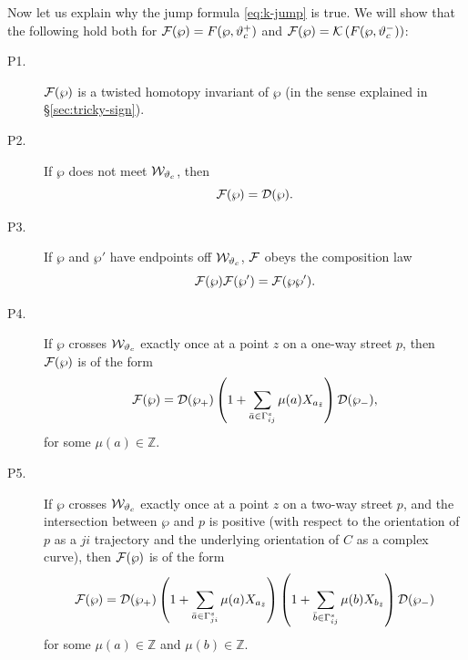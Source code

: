 \documentclass[11pt,a4paper]{article}
\def\Z{{\mathbb{Z}}}
\def\CD {{\cal D}}
\def\CF {{\cal F}}
\def\wnet {{\cal W}}
\def\cK{{\cal K}}
\def\tz{{\tilde z}}
\def\CD {{\cal D}}
\def\CF {{\cal F}}
\def\wnet {{\cal W}}
\begin{document}
Now let us explain why the jump formula \eqref{eq:k-jump} is true.
We will show that
the following hold both
for $\CF(\wp) = F(\wp, \vartheta_c^+)$ and $\CF(\wp) = \cK\left(F(\wp, \vartheta_c^-)\right)$:
\begin{description}
 \item[P1.] $\CF(\wp)$ is a twisted homotopy invariant of $\wp$ (in the sense explained
in \S\ref{sec:tricky-sign}).
 \item[P2.] If $\wp$ does not meet $\wnet_{\vartheta_c}$, then
\begin{equation}
 \CF(\wp) = \CD(\wp).
\end{equation}
 \item[P3.] If $\wp$ and $\wp'$ have endpoints off $\wnet_{\vartheta_c}$, $\CF$ obeys the composition law
\begin{equation}
 \CF(\wp) \CF(\wp') = \CF(\wp \wp').
\end{equation}
 \item[P4.] If $\wp$ crosses $\wnet_{\vartheta_c}$ exactly once at a point $z$ on a one-way street $p$, then $\CF(\wp)$ is of the form
\begin{equation} \label{eq:f-one-way}
 \CF(\wp) = \CD(\wp_+) \left(1 + \sum_{\bar a \in \Gamma_{ij}^s} \mu(a) X_{a_\tz}\right) \CD(\wp_-),
\end{equation}
for some $\mu(a) \in \Z$.
\item[P5.] If $\wp$ crosses $\wnet_{\vartheta_c}$ exactly once at a point $z$ on a two-way street $p$, and the intersection between $\wp$ and $p$
is positive (with respect to the orientation of $p$ as a $ji$ trajectory and the underlying orientation of $C$ as a complex curve),
then $\CF(\wp)$ is of the form
\begin{equation} \label{eq:f-two-way}
 \CF(\wp) = \CD(\wp_+) \left(1 + \sum_{\bar a \in \Gamma_{ji}^s} \mu(a) X_{a_\tz}\right) \left(1 + \sum_{\bar b \in \Gamma_{ij}^s} \mu(b) X_{b_\tz} \right) \CD(\wp_-)
\end{equation}
for some $\mu(a) \in \Z$ and $\mu(b) \in \Z$.
\end{description}
\end{document}
